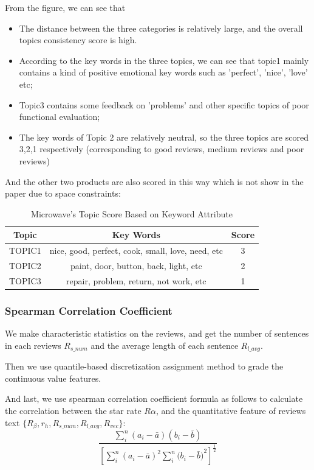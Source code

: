 \documentclass{mcmthesis}
\begin{document}
From the figure, we can see that 
\begin{itemize}
	\item The distance between the three categories is relatively large, and the overall topics consistency score is high. 
	\item According to the key words in the three topics, we can see that topic1 mainly contains a kind of positive emotional key words such as 'perfect', 'nice', 'love' etc;
	\item Topic3 contains some feedback on 'problems' and other specific topics of poor functional evaluation; 
	\item The key words of Topic 2 are relatively neutral, so the three topics are scored 3,2,1 respectively (corresponding to good reviews, medium reviews and poor reviews)
\end{itemize}
And the other two products are also scored in this way which is not show in the paper due to space constraints:
\begin{table}[H]
	\center
	\caption{ Microwave's Topic Score Based on Keyword Attribute}
	\label{type}
	\begin{tabular}{c|c|c}
		\hline
		\textbf{Topic} & \textbf{Key Words} & \textbf{Score} \\ \hline
		TOPIC1                & nice, good, perfect, cook, small, love, need, etc        		&	3          \\ 
		TOPIC2                & paint, door, button, back, light, etc  &	2                 \\ 
		TOPIC3                & repair, problem, return, not work, etc                   		&	1	\\ \hline
	\end{tabular}
\end{table}
\subsubsection{Spearman Correlation Coefficient}
We make characteristic statistics on the reviews, and get the number of sentences in each reviews $R_{s\_{num}}$ and the average length of each sentence $R_{l\_{avg}}$. 

Then we use quantile-based discretization assignment method to grade the continuous value features.

And last, we use spearman correlation coefficient formula as follows to calculate the correlation between the star rate $R {\alpha} $, and the quantitative feature of reviews text ${\{R_{\beta},r_{h},R_{s\_{num}},R_{l\_{avg}},R_{vec}\}}$:
\begin{equation}
	{\frac{\sum_{i}^{n}(a_{i}-\bar{a})(b_{i}-\bar{b})}{{[\sum_{i}^{n}{(a_{i}-\bar{a})}^2\sum_{i}^{n}({b_{i}-\bar{b})}^2]}^{\frac{1}{2}}}}
\end{equation} 
\end{document}
